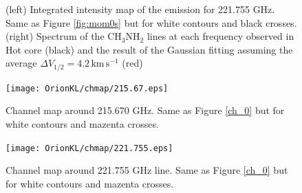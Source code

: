 \begin{figure}[htp]
\begin{center}
\begin{minipage}{0.98\textwidth}
\begin{center}
\begin{minipage}{0.48\textwidth}
\begin{center}
\end{center}
\end{minipage}
\end{center}
\end{minipage}
\caption{(left) Integrated intensity map of the emission for 221.755 GHz. Same as Figure \ref{fig:mom0s} but for white contours and black crosses. (right) Spectrum of the CH$_3$NH$_2$ lines at each frequency observed in Hot core (black)  and the result of the Gaussian fitting assuming the average $\Delta V_{1/2} = 4.2\, \mathrm{km\,s^{-1}}$ (red)}
\end{center}
\end{figure}

\begin{figure}[htp]
  \centering
  \texttt{[image: OrionKL/chmap/215.67.eps]}
  \caption{Channel map around 215.670 GHz. Same as Figure \ref{ch_0} but for white contours and mazenta crosses.}
  \label{ch_4}
\end{figure}

\begin{figure}[htp]
  \centering
  \texttt{[image: OrionKL/chmap/221.755.eps]}
  \caption{Channel map around 221.755 GHz line. Same as Figure \ref{ch_0} but for white contours and mazenta crosses.}
  \label{ch_6}
\end{figure}
